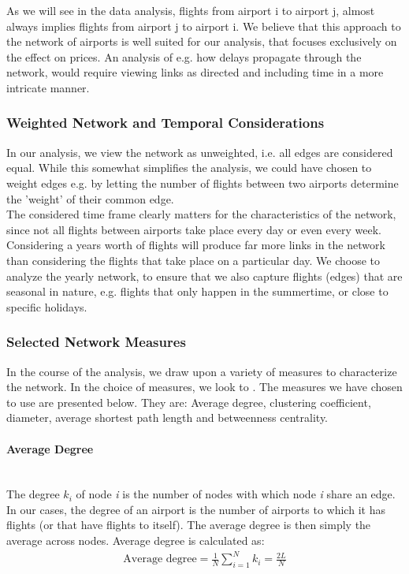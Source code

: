 As we will see in the data analysis, flights from airport i to airport j, almost always implies flights from airport j to airport i. We believe that this approach to the network of airports is well suited for our analysis, that focuses exclusively on the effect on prices. An analysis of e.g. how delays propagate through the network, would require viewing links as directed and including time in a more intricate manner.

\subsubsection{Weighted Network and Temporal Considerations}
In our analysis, we view the network as unweighted, i.e. all edges are considered equal. While this somewhat simplifies the analysis, we could have chosen to weight edges e.g. by letting the number of flights between two airports determine the 'weight' of their common edge. 
\medskip \\
The considered time frame clearly matters for the characteristics of the network, since not all flights between airports take place every day or even every week. Considering a years worth of flights will produce far more links in the network than considering the flights that take place on a particular day. We choose to analyze the yearly network, to ensure that we also capture flights (edges) that are seasonal in nature, e.g. flights that only happen in the summertime, or close to specific holidays. 

\subsubsection{Selected Network Measures}
In the course of the analysis, we draw upon a variety of measures to characterize the network. In the choice of measures, we look to \citet{chi2004structural}. The measures we have chosen to use are presented below. They are: Average degree, clustering coefficient, diameter, average shortest path length and betweenness centrality.

\paragraph{Average Degree}\mbox{} \\
The degree $k_i$ of node \textit{i} is the number of nodes with which node \textit{i} share an edge. In our cases, the degree of an airport is the number of airports to which it has flights (or that have flights to itself). 
The average degree is then simply the average across nodes. Average degree is calculated as: 
\begin{align}
    \text{Average degree} = \frac{1}{N} \sum_{i = 1}^N k_i = \frac{2L}{N}
\end{align}

